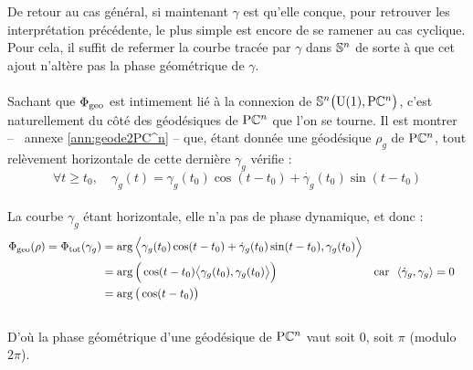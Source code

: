 De retour au cas général, si maintenant $\gamma$ est qu'elle conque, pour retrouver les interprétation précédente, le plus simple est encore de se ramener au cas cyclique.
Pour cela, il suffit de refermer la courbe tracée par $\gamma$ dans $\S{n}$ de sorte à que cet ajout n'altère pas la phase géométrique de $\gamma$.
\\

\\

Sachant que $\phaseg$ est intimement lié à la connexion de $\VFP$, c'est naturellement du côté des géodésiques de $\PC{n}$ que l'on se tourne. Il est montrer -- \cf~annexe \ref{ann:geode2PC^n} -- que, étant donnée une géodésique $\rho_g$ de $\PC{n}$, tout relèvement horizontale de cette dernière $\gamma_g$ vérifie :
\begin{equation}\label{eq:2geodesique}
	\forall t\geq t_0,\quad \gamma_g(t) = \gamma_g(t_0) \cos (t - t_0) + \dot{\gamma_g}(t_0) \sin (t - t_0)
\end{equation}
\\
La courbe $\gamma_g$ étant horizontale, elle n'a pas de phase dynamique, et donc :
\begin{align*}
	\phaseg(\rho) = \phaset(\gamma_g) 
	&= \arg\Big\langle \gamma_g(t_0) \cos (t - t_0) + \dot{\gamma}_g(t_0) \sin (t - t_0),  \gamma_g(t_0) \Big\rangle \\
	&= \arg\Big(\cos (t - t_0)\big\langle \gamma_g(t_0) ,  \gamma_g(t_0) \big\rangle\Big)   &  \text{car }\ \langle\dot{\gamma}_g,  \gamma_g \rangle &= 0\\
	&= \arg\big(\cos (t - t_0)\big)
\end{align*}
\\ 
D'où la phase géométrique d'une géodésique de $\PC{n}$ vaut soit $0$, soit $\pi$ (modulo $2\pi$).
\\
